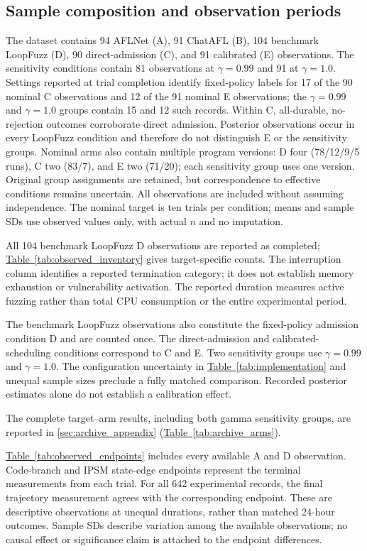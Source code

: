 \documentclass[final,5p,times,number]{elsarticle}
\newcommand{\namedref}[2]{\hyperref[#2]{#1~\ref*{#2}}}
\begin{document}
\subsection{Sample composition and observation periods}
The dataset contains 94 AFLNet (A), 91 ChatAFL (B), 104 benchmark LoopFuzz (D), 90 direct-admission (C), and 91 calibrated (E) observations. The sensitivity conditions contain 81 observations at $\gamma=0.99$ and 91 at $\gamma=1.0$. Settings reported at trial completion identify fixed-policy labels for 17 of the 90 nominal C observations and 12 of the 91 nominal E observations; the $\gamma=0.99$ and $\gamma=1.0$ groups contain 15 and 12 such records. Within C, all-durable, no-rejection outcomes corroborate direct admission. Posterior observations occur in every LoopFuzz condition and therefore do not distinguish E or the sensitivity groups. Nominal arms also contain multiple program versions: D four (78/12/9/5 runs), C two (83/7), and E two (71/20); each sensitivity group uses one version. Original group assignments are retained, but correspondence to effective conditions remains uncertain. All observations are included without assuming independence. The nominal target is ten trials per condition; means and sample SDs use observed values only, with actual $n$ and no imputation.

All 104 benchmark LoopFuzz D observations are reported as completed; \namedref{Table}{tab:observed_inventory} gives target-specific counts. The interruption column identifies a reported termination category; it does not establish memory exhaustion or vulnerability activation. The reported duration measures active fuzzing rather than total CPU consumption or the entire experimental period.

The benchmark LoopFuzz observations also constitute the fixed-policy admission condition D and are counted once. The direct-admission and calibrated-scheduling conditions correspond to C and E. Two sensitivity groups use $\gamma=0.99$ and $\gamma=1.0$. The configuration uncertainty in \namedref{Table}{tab:implementation} and unequal sample sizes preclude a fully matched comparison. Recorded posterior estimates alone do not establish a calibration effect.


The complete target--arm results, including both gamma sensitivity groups, are reported in \ref{sec:archive_appendix} (\namedref{Table}{tab:archive_arms}).

\namedref{Table}{tab:observed_endpoints} includes every available A and D observation. Code-branch and IPSM state-edge endpoints represent the terminal measurements from each trial. For all 642 experimental records, the final trajectory measurement agrees with the corresponding endpoint. These are descriptive observations at unequal durations, rather than matched 24-hour outcomes. Sample SDs describe variation among the available observations; no causal effect or significance claim is attached to the endpoint differences.
\end{document}

